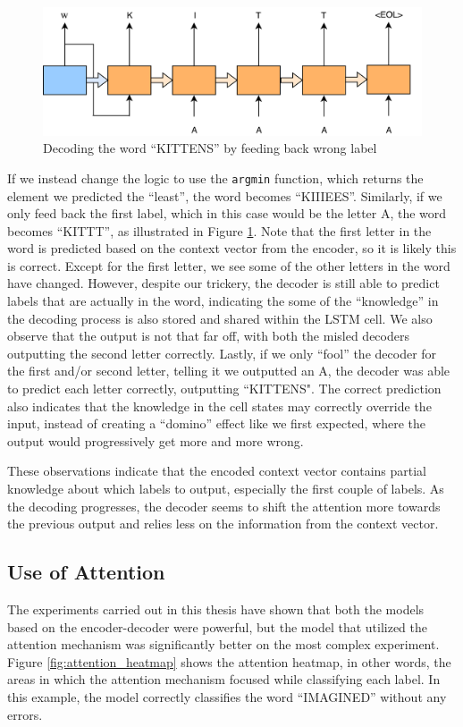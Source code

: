 \begin{figure}[!ht]
    \centering
    \includegraphics[width=1\textwidth]{fig/results/kittens_wrong.png}
    \caption{Decoding the word ``KITTENS'' by feeding back wrong label}
    \label{fig:kittens_wrong}
\end{figure}

If we instead change the logic to use the {\tt argmin} function, which returns the element we predicted the ``least'', the word becomes ``KIIIEES''. Similarly, if we only feed back the first label, which in this case would be the letter A, the word becomes ``KITTT'', as illustrated in Figure \ref{fig:kittens_wrong}. Note that the first letter in the word is predicted based on the context vector from the encoder, so it is likely this is correct. Except for the first letter, we see some of the other letters in the word have changed. However, despite our trickery, the decoder is still able to predict labels that are actually in the word, indicating the some of the ``knowledge'' in the decoding process is also stored and shared within the LSTM cell. We also observe that the output is not that far off, with both the misled decoders outputting the second letter correctly. Lastly, if we only ``fool'' the decoder for the first and/or second letter, telling it we outputted an A, the decoder was able to predict each letter correctly, outputting ``KITTENS". The correct prediction also indicates that the knowledge in the cell states may correctly override the input, instead of creating a ``domino'' effect like we first expected, where the output would progressively get more and more wrong.

These observations indicate that the encoded context vector contains partial knowledge about which labels to output, especially the first couple of labels. As the decoding progresses, the decoder seems to shift the attention more towards the previous output and relies less on the information from the context vector.

\subsection{Use of Attention}
The experiments carried out in this thesis have shown that both the models based on the encoder-decoder were powerful, but the model that utilized the attention mechanism was significantly better on the most complex experiment. Figure \ref{fig:attention_heatmap} shows the attention heatmap, in other words, the areas in which the attention mechanism focused while classifying each label. In this example, the model correctly classifies the word ``IMAGINED'' without any errors. 

